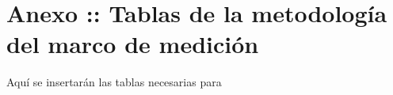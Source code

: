 \chapter{Anexo :: Tablas de la metodología del  marco de medición}
\label{cap:AnexoTablas}

Aquí se insertarán las tablas necesarias para 